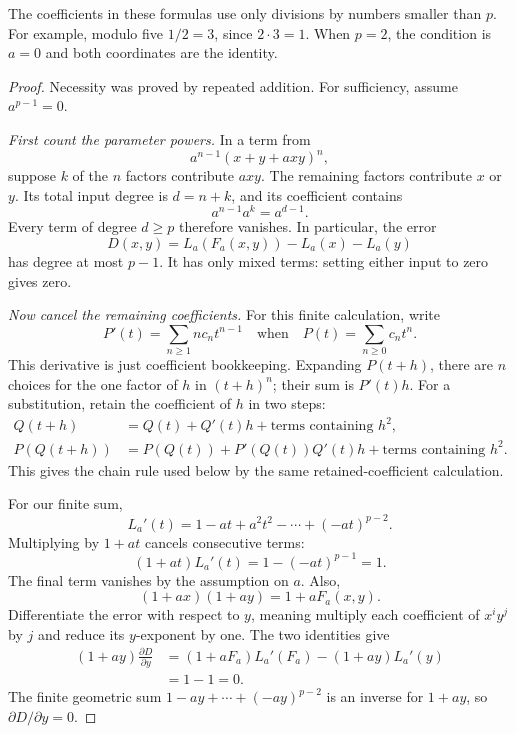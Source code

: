 The coefficients in these formulas use only divisions by numbers smaller than \(p\). For example, modulo five \(1/2=3\), since \(2\cdot3=1\). When \(p=2\), the condition is \(a=0\) and both coordinates are the identity.

\begin{proof}
Necessity was proved by repeated addition. For sufficiency, assume \(a^{p-1}=0\).

\emph{First count the parameter powers.} In a term from
\[
 a^{n-1}(x+y+a xy)^n,
\]
suppose \(k\) of the \(n\) factors contribute \(a xy\). The remaining factors contribute \(x\) or \(y\). Its total input degree is \(d=n+k\), and its coefficient contains
\[
 a^{n-1}a^k=a^{d-1}.
\]
Every term of degree \(d\ge p\) therefore vanishes. In particular, the error
\[
 D(x,y)=L_a(F_a(x,y))-L_a(x)-L_a(y)
\]
has degree at most \(p-1\). It has only mixed terms: setting either input to zero gives zero.

\emph{Now cancel the remaining coefficients.} For this finite calculation, write
\[
 P'(t)=\sum_{n\ge1}n c_nt^{n-1}
 \quad\text{when}\quad P(t)=\sum_{n\ge0}c_nt^n.
\]
This derivative is just coefficient bookkeeping. Expanding \(P(t+h)\), there are \(n\) choices for the one factor of \(h\) in \((t+h)^n\); their sum is \(P'(t)h\). For a substitution, retain the coefficient of \(h\) in two steps:
\begin{align*}
 Q(t+h)&=Q(t)+Q'(t)h+\text{terms containing }h^2,\\
 P(Q(t+h))&=P(Q(t))+P'(Q(t))Q'(t)h
 +\text{terms containing }h^2.
\end{align*}
This gives the chain rule used below by the same retained-coefficient calculation.

For our finite sum,
\[
 L_a'(t)=1-at+a^2t^2-\cdots+(-at)^{p-2}.
\]
Multiplying by \(1+at\) cancels consecutive terms:
\begin{equation}\label{eq:finite-geometric}
 (1+at)L_a'(t)=1-(-at)^{p-1}=1.
\end{equation}
The final term vanishes by the assumption on \(a\). Also,
\[
 (1+ax)(1+ay)=1+aF_a(x,y).
\]
Differentiate the error with respect to \(y\), meaning multiply each coefficient of \(x^iy^j\) by \(j\) and reduce its \(y\)-exponent by one. The two identities give
\begin{align*}
 (1+ay)\frac{\partial D}{\partial y}
 &=(1+aF_a)L_a'(F_a)-(1+ay)L_a'(y)\\
 &=1-1=0.
\end{align*}
The finite geometric sum \(1-ay+\cdots+(-ay)^{p-2}\) is an inverse for \(1+ay\), so \(\partial D/\partial y=0\).


\end{proof}
